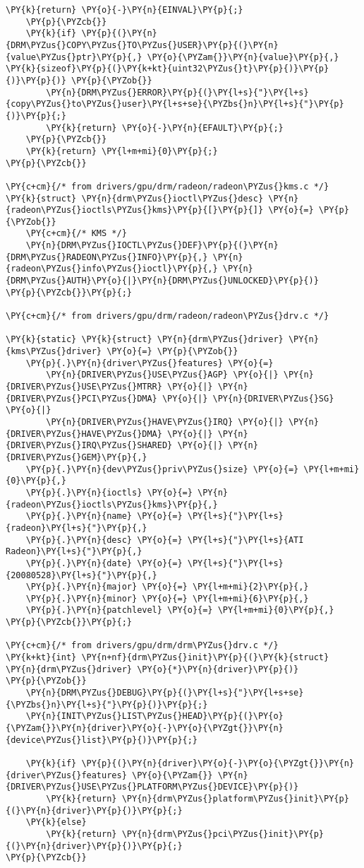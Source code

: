 \begin{Verbatim}[commandchars=\\\{\}]
		\PY{k}{return} \PY{o}{-}\PY{n}{EINVAL}\PY{p}{;}
	\PY{p}{\PYZcb{}}
	\PY{k}{if} \PY{p}{(}\PY{n}{DRM\PYZus{}COPY\PYZus{}TO\PYZus{}USER}\PY{p}{(}\PY{n}{value\PYZus{}ptr}\PY{p}{,} \PY{o}{\PYZam{}}\PY{n}{value}\PY{p}{,} \PY{k}{sizeof}\PY{p}{(}\PY{k+kt}{uint32\PYZus{}t}\PY{p}{)}\PY{p}{)}\PY{p}{)} \PY{p}{\PYZob{}}
		\PY{n}{DRM\PYZus{}ERROR}\PY{p}{(}\PY{l+s}{"}\PY{l+s}{copy\PYZus{}to\PYZus{}user}\PY{l+s+se}{\PYZbs{}n}\PY{l+s}{"}\PY{p}{)}\PY{p}{;}
		\PY{k}{return} \PY{o}{-}\PY{n}{EFAULT}\PY{p}{;}
	\PY{p}{\PYZcb{}}
	\PY{k}{return} \PY{l+m+mi}{0}\PY{p}{;}
\PY{p}{\PYZcb{}}

\PY{c+cm}{/* from drivers/gpu/drm/radeon/radeon\PYZus{}kms.c */}
\PY{k}{struct} \PY{n}{drm\PYZus{}ioctl\PYZus{}desc} \PY{n}{radeon\PYZus{}ioctls\PYZus{}kms}\PY{p}{[}\PY{p}{]} \PY{o}{=} \PY{p}{\PYZob{}}
	\PY{c+cm}{/* KMS */}
	\PY{n}{DRM\PYZus{}IOCTL\PYZus{}DEF}\PY{p}{(}\PY{n}{DRM\PYZus{}RADEON\PYZus{}INFO}\PY{p}{,} \PY{n}{radeon\PYZus{}info\PYZus{}ioctl}\PY{p}{,} \PY{n}{DRM\PYZus{}AUTH}\PY{o}{|}\PY{n}{DRM\PYZus{}UNLOCKED}\PY{p}{)}
\PY{p}{\PYZcb{}}\PY{p}{;}

\PY{c+cm}{/* from drivers/gpu/drm/radeon/radeon\PYZus{}drv.c */}

\PY{k}{static} \PY{k}{struct} \PY{n}{drm\PYZus{}driver} \PY{n}{kms\PYZus{}driver} \PY{o}{=} \PY{p}{\PYZob{}}
	\PY{p}{.}\PY{n}{driver\PYZus{}features} \PY{o}{=}
	    \PY{n}{DRIVER\PYZus{}USE\PYZus{}AGP} \PY{o}{|} \PY{n}{DRIVER\PYZus{}USE\PYZus{}MTRR} \PY{o}{|} \PY{n}{DRIVER\PYZus{}PCI\PYZus{}DMA} \PY{o}{|} \PY{n}{DRIVER\PYZus{}SG} \PY{o}{|}
	    \PY{n}{DRIVER\PYZus{}HAVE\PYZus{}IRQ} \PY{o}{|} \PY{n}{DRIVER\PYZus{}HAVE\PYZus{}DMA} \PY{o}{|} \PY{n}{DRIVER\PYZus{}IRQ\PYZus{}SHARED} \PY{o}{|} \PY{n}{DRIVER\PYZus{}GEM}\PY{p}{,}
	\PY{p}{.}\PY{n}{dev\PYZus{}priv\PYZus{}size} \PY{o}{=} \PY{l+m+mi}{0}\PY{p}{,}
	\PY{p}{.}\PY{n}{ioctls} \PY{o}{=} \PY{n}{radeon\PYZus{}ioctls\PYZus{}kms}\PY{p}{,}
	\PY{p}{.}\PY{n}{name} \PY{o}{=} \PY{l+s}{"}\PY{l+s}{radeon}\PY{l+s}{"}\PY{p}{,}
	\PY{p}{.}\PY{n}{desc} \PY{o}{=} \PY{l+s}{"}\PY{l+s}{ATI Radeon}\PY{l+s}{"}\PY{p}{,}
	\PY{p}{.}\PY{n}{date} \PY{o}{=} \PY{l+s}{"}\PY{l+s}{20080528}\PY{l+s}{"}\PY{p}{,}
	\PY{p}{.}\PY{n}{major} \PY{o}{=} \PY{l+m+mi}{2}\PY{p}{,}
	\PY{p}{.}\PY{n}{minor} \PY{o}{=} \PY{l+m+mi}{6}\PY{p}{,}
	\PY{p}{.}\PY{n}{patchlevel} \PY{o}{=} \PY{l+m+mi}{0}\PY{p}{,}
\PY{p}{\PYZcb{}}\PY{p}{;}

\PY{c+cm}{/* from drivers/gpu/drm/drm\PYZus{}drv.c */}
\PY{k+kt}{int} \PY{n+nf}{drm\PYZus{}init}\PY{p}{(}\PY{k}{struct} \PY{n}{drm\PYZus{}driver} \PY{o}{*}\PY{n}{driver}\PY{p}{)}
\PY{p}{\PYZob{}}
	\PY{n}{DRM\PYZus{}DEBUG}\PY{p}{(}\PY{l+s}{"}\PY{l+s+se}{\PYZbs{}n}\PY{l+s}{"}\PY{p}{)}\PY{p}{;}
	\PY{n}{INIT\PYZus{}LIST\PYZus{}HEAD}\PY{p}{(}\PY{o}{\PYZam{}}\PY{n}{driver}\PY{o}{-}\PY{o}{\PYZgt{}}\PY{n}{device\PYZus{}list}\PY{p}{)}\PY{p}{;}

	\PY{k}{if} \PY{p}{(}\PY{n}{driver}\PY{o}{-}\PY{o}{\PYZgt{}}\PY{n}{driver\PYZus{}features} \PY{o}{\PYZam{}} \PY{n}{DRIVER\PYZus{}USE\PYZus{}PLATFORM\PYZus{}DEVICE}\PY{p}{)}
		\PY{k}{return} \PY{n}{drm\PYZus{}platform\PYZus{}init}\PY{p}{(}\PY{n}{driver}\PY{p}{)}\PY{p}{;}
	\PY{k}{else}
		\PY{k}{return} \PY{n}{drm\PYZus{}pci\PYZus{}init}\PY{p}{(}\PY{n}{driver}\PY{p}{)}\PY{p}{;}
\PY{p}{\PYZcb{}}
\end{Verbatim}
